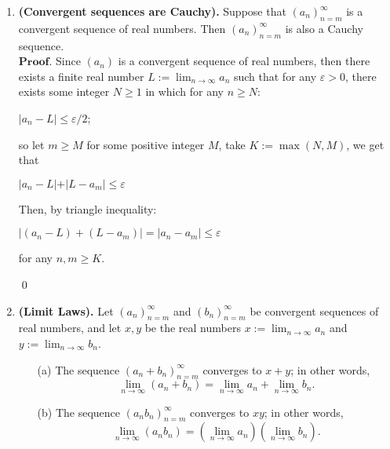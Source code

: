 \documentclass{article}
\theoremstyle{remark}
\begin{document}
        \begin{enumerate}
            \item \textbf{(Convergent sequences are Cauchy).} Suppose that \( (a_n)_{n=m}^{\infty} \) is a convergent sequence of real numbers. Then \( (a_n)_{n=m}^{\infty} \) is also a Cauchy sequence.\\
            $\textbf{Proof.}$
            Since $(a_n)$ is a convergent sequence of real numbers, then there exists a finite real number $L := \lim_{n\to \infty}a_n$ such that 
            for any $\varepsilon > 0$, there exists some integer $N \geq 1$ in which for any $n \geq N$:
            \begin{center}
                $\displaystyle \vert a_n - L\vert \leq \varepsilon/2$;
            \end{center}
            so let $m \geq M$ for some positive integer $M$, take $K := \max(N, M)$, we get that 
            \begin{center}
                $\displaystyle \vert a_n - L\vert + \vert L - a_m \vert \leq \varepsilon$
            \end{center}
            Then, by triangle inequality:
            \begin{center}
                $\displaystyle \vert (a_n - L) + (L - a_m) \vert = \vert a_n - a_m \vert \leq \varepsilon$
            \end{center}
            for any $n,m \geq K$.
            \begin{flushright}
                \qed
            \end{flushright}

            \item \textbf{(Limit Laws).} Let \( (a_n)_{n=m}^{\infty} \) and \( (b_n)_{n=m}^{\infty} \) be convergent sequences of real numbers, and let \( x, y \) be the real numbers \( x := \lim_{n \to \infty} a_n \) and \( y := \lim_{n \to \infty} b_n \).

            \begin{enumerate}
                \item[(a)] The sequence \( (a_n + b_n)_{n=m}^{\infty} \) converges to \( x + y \); in other words, 
                \[
                \lim_{n \to \infty} (a_n + b_n) = \lim_{n \to \infty} a_n + \lim_{n \to \infty} b_n.
                \]
                
                \item[(b)] The sequence \( (a_n b_n)_{n=m}^{\infty} \) converges to \( xy \); in other words,
                \[
                \lim_{n \to \infty} (a_n b_n) = \left( \lim_{n \to \infty} a_n \right) \left( \lim_{n \to \infty} b_n \right).
                \]
            

\end{enumerate}
\end{enumerate}
\end{document}
